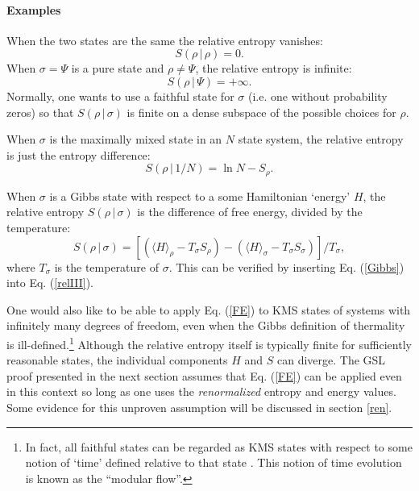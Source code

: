\documentclass[12pt]{article}
\begin{document}
\paragraph{Examples} When the two states are the same the relative entropy vanishes:
\begin{equation}
S(\rho\,|\,\rho) = 0.
\end{equation}
When $\sigma = \Psi$ is a pure state and $\rho \ne \Psi$, the relative entropy is infinite:
\begin{equation}
S(\rho\,|\,\Psi) = +\infty.
\end{equation}
Normally, one wants to use a faithful state for $\sigma$ (i.e. one without probability zeros) so that $S(\rho\,|\,\sigma)$ is finite on a dense subspace of the possible choices for $\rho$.

When $\sigma$ is the maximally mixed state in an $N$ state system, the relative entropy is just the entropy difference:
\begin{equation}
S(\rho\,|\,1/N) = \ln N - S_\rho.
\end{equation}

When $\sigma$ is a Gibbs state with respect to a some Hamiltonian `energy' $H$, the relative entropy $S (\rho\,|\,\sigma)$ is the difference of free energy, divided by the temperature:
\begin{equation}\label{FE}
S(\rho\,|\,\sigma) = [(\langle H \rangle_\rho - T_\sigma S_\rho) - (\langle H \rangle_\sigma - T_\sigma S_\sigma)]/T_\sigma,
\end{equation}
where $T_\sigma$ is the temperature of $\sigma$.  This can be verified by inserting Eq. (\ref{Gibbs}) into Eq. (\ref{relIII}).

One would also like to be able to apply Eq. (\ref{FE}) to KMS states of systems with infinitely many degrees of freedom, even when the Gibbs definition of thermality is ill-defined.\footnote{In fact, all faithful states can be regarded as KMS states with respect to some notion of `time' defined relative to that state \cite{summers05}.  This notion of time evolution is known as the ``modular flow''.}  Although the relative entropy itself is typically finite for sufficiently reasonable states, the individual components $H$ and $S$ can diverge.  The GSL proof presented in the next section assumes that Eq. (\ref {FE}) can be applied even in this context so long as one uses the \emph{renormalized} entropy and energy values.  Some evidence for this unproven assumption will be discussed in section \ref{ren}.
\end{document}
